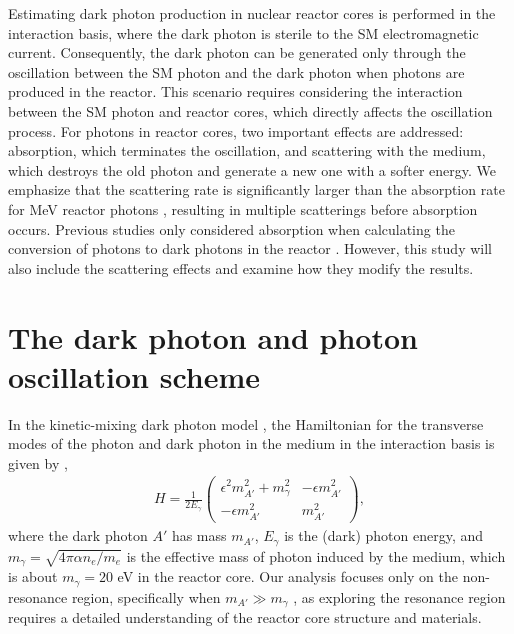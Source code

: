 \documentclass[prd,showpacs,preprintnumbers,amsmath,amssymb,twocolumn,superscriptaddress,notitlepage]{revtex4-2}
\begin{document}
Estimating dark photon production in nuclear reactor cores is performed in the interaction basis, where the dark photon is sterile to the SM electromagnetic current. Consequently, the dark photon can be generated only through the oscillation between the SM photon and the dark photon when photons are produced in the reactor. This scenario requires considering the interaction between the SM photon and reactor cores, which directly affects the oscillation process. For photons in reactor cores, two important effects are addressed: absorption, which terminates the oscillation, and scattering with the medium, which destroys the old photon and generate a new one with a softer energy. We emphasize that the scattering rate is significantly larger than the absorption rate for MeV reactor photons \cite{ParticleDataGroup:2022pth}, resulting in multiple scatterings before absorption occurs. Previous studies only considered absorption when calculating the conversion of photons to dark photons in the reactor \cite{Danilov:2018bks, Seo:2020dtx}. However, this study will also include the scattering effects and examine how they modify the results.
\\


\section{The dark photon and photon oscillation scheme}


In the kinetic-mixing dark photon model \cite{Holdom:1985ag}, the Hamiltonian for the transverse modes of the photon and dark photon in the medium 
in the interaction basis
is given by \cite{Redondo:2013lna}, 
\begin{eqnarray}
H=\frac{1}{2 E_\gamma}\left(\begin{array}{cc}
\epsilon^2 m_{A'}^2+m_\gamma^2 & -\epsilon m_{A'}^2 \\
-\epsilon m_{A'}^2 & m_{A'}^2
\end{array}\right), 
\label{eq: int Ham}
\end{eqnarray}
where the dark photon $A'$ has mass $m_{A'}$,
$E_\gamma$ is the (dark) photon energy,
and $m_\gamma=\sqrt{4 \pi \alpha n_e / m_e}$ is the effective mass of photon induced by the medium, which is about $m_\gamma = 20$ eV \cite{Danilov:2018bks} in the reactor core. Our analysis focuses only on the non-resonance region, specifically when $m_{A'} \gg m_\gamma$ \cite{Danilov:2018bks}, as exploring the resonance region requires a detailed understanding of the reactor core structure and materials.
\end{document}

